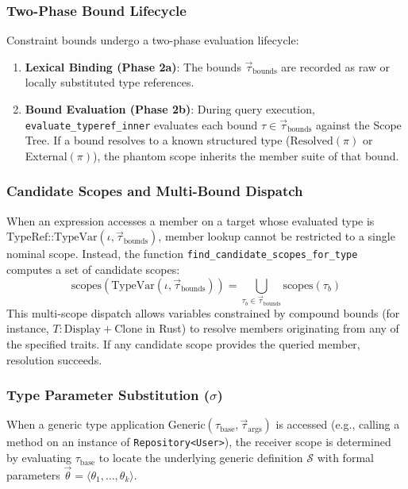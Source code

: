 \subsubsection{Two-Phase Bound Lifecycle}

Constraint bounds undergo a two-phase evaluation lifecycle:
\begin{enumerate}
  \item \textbf{Lexical Binding (Phase 2a)}: The bounds
    $\vec{\tau}_{\text{bounds}}$
    are recorded as raw or locally substituted type references.
  \item \textbf{Bound Evaluation (Phase 2b)}: During query execution,
    \texttt{evaluate\_}\-\texttt{typeref\_inner} evaluates each bound $\tau
    \in \vec{\tau}_{\text{bounds}}$
    against the Scope Tree. If a bound resolves to a known structured type
    ($\text{Resolved}(\pi)$ or Ex\-ter\-nal$(\pi)$), the phantom scope
    inherits the member suite of that bound.
\end{enumerate}

\subsubsection{Candidate Scopes and Multi-Bound Dispatch}

When an expression accesses a member on a target whose evaluated type is
$\text{TypeRef::TypeVar}(\iota, \vec{\tau}_{\text{bounds}})$, member lookup
cannot be restricted to a single nominal scope. Instead, the function
\texttt{find\_candidate\_scopes\_for\_type} computes a set of candidate scopes:
$$\text{scopes}(\text{TypeVar}(\iota, \vec{\tau}_{\text{bounds}})) =
\bigcup_{\tau_b \in \vec{\tau}_{\text{bounds}}} \text{scopes}(\tau_b)$$
This multi-scope dispatch allows variables constrained by compound bounds
(for instance, $T: \text{Display} + \text{Clone}$ in Rust) to resolve members
originating from any of the specified traits. If any candidate scope provides
the queried member, resolution succeeds.

\subsubsection{Type Parameter Substitution ($\sigma$)}

When a generic type application $\text{Generic}(\tau_{\text{base}},
\vec{\tau}_{\text{args}})$
is accessed (e.g., calling a method on an instance of
\texttt{Repository<User>}),
the receiver scope is determined by evaluating $\tau_{\text{base}}$ to locate
the underlying generic definition $\mathcal{S}$ with formal parameters
$\vec{\theta} = \langle \theta_1, \ldots, \theta_k \rangle$.

